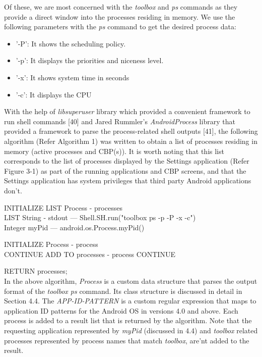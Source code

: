 \documentclass[12pt]{uthesis-v12}  %
\begin{document}
			Of these, we are most concerned with the {\em toolbox} and {\em ps} commands as they provide a direct window into the processes residing in memory. We use the following parameters with the {\em ps} command to get the desired process data:
			
			\begin{itemize}
				\item '-P': It shows the scheduling policy.
				\item '-p': It displays the priorities and niceness level.
				\item '-x': It shows system time in seconds
				\item '-c': It displays the CPU
			\end{itemize}
			
			With the help of {\em libsuperuser} library which provided a convenient framework to run shell commands [40] and Jared Rummler's {\em AndroidProcess} library that provided a framework to parse the process-related shell outputs [41], the following algorithm (Refer Algorithm 1) was written to obtain a list of processes residing in memory (active processes and CBP(s)). It is worth noting that this list corresponds to the list of processes displayed by the Settings application (Refer Figure 3-1) as part of the running applications and CBP screens, and that the Settings application has system privileges that third party Android applications don't.\\ 
			
			\begin{algorithm}[H]
				\SetAlgoLined
				
				INITIALIZE LIST Process - processes\\
				LIST String - stdout --- Shell.SH.run("toolbox ps -p -P -x -c")\\
				Integer myPid 		 --- android.os.Process.myPid()
				
				{
					INITIALIZE Process - process\\
					{
						{
							CONTINUE
						}
						{
							ADD TO processes - process
						}
					}
					{
						CONTINUE
					}
				}
				
				RETURN processes;\\
			
			\caption[Algorithm to get list of processes in RAM]{In the above algorithm, {\em Process} is a custom data structure that parses the output format of the {\em toolbox ps} command. Its class structure is discussed in detail in Section 4.4. The {\em APP-ID-PATTERN} is a custom regular expression that maps to application ID patterns for the Android OS in versions 4.0 and above. Each process is added to a result list that is returned by the algorithm. Note that the requesting application represented by {\em myPid} (discussed in 4.4) and {\em toolbox} related processes represented by process names that match {\em toolbox}, are'nt added to the result.}
			\end{algorithm}			
			
\end{document}
